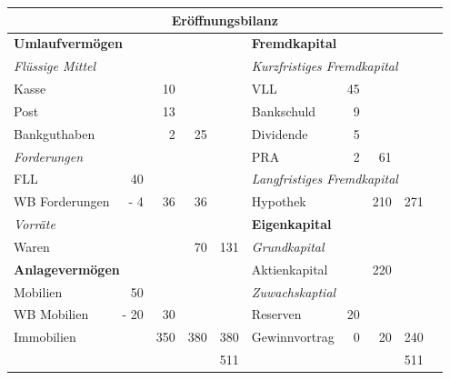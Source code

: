 \documentclass{standalone}
\begin{document}
\begin{tabular}{lrrrr|lrrrr}
    \multicolumn{10}{c}{\textbf{Eröffnungsbilanz}}\\
    \toprule
    \multicolumn{5}{l|}{\textbf{Umlaufvermögen}}&
    \multicolumn{5}{l}{\textbf{Fremdkapital}}\\
    \multicolumn{5}{l|}{\textit{Flüssige Mittel}}&
    \multicolumn{5}{l}{\textit{Kurzfristiges Fremdkapital}}\\
    Kasse&&10&&&VLL&45&&&\\
    Post&&13&&&Bankschuld&9&&&\\
    Bankguthaben&&2&25&&Dividende&5&&&\\
    \multicolumn{5}{l|}{\textit{Forderungen}}&
    PRA&2&61&&\\
    FLL&40&&&&\multicolumn{5}{l}{\textit{Langfristiges Fremdkapital}}\\
    WB Forderungen&- 4&36&36&&Hypothek&&210&271&\\
    \multicolumn{5}{l|}{\textit{Vorräte}}&
    \multicolumn{5}{l}{\textbf{Eigenkapital}}\\
    Waren&&&70&131&
    \multicolumn{5}{l}{\textit{Grundkapital}}\\
    \multicolumn{5}{l|}{\textbf{Anlagevermögen}}&
    Aktienkapital&&220&&\\
    Mobilien&50&&&&
    \multicolumn{5}{l}{\textit{Zuwachskaptial}}\\
    WB Mobilien&- 20&30&&&Reserven&20&&&\\
    Immobilien&&350&380&380&Gewinnvortrag&0&20&240&\\
    \midrule
    &&&&511&&&&511\\
    \bottomrule
\end{tabular}
\end{document}
